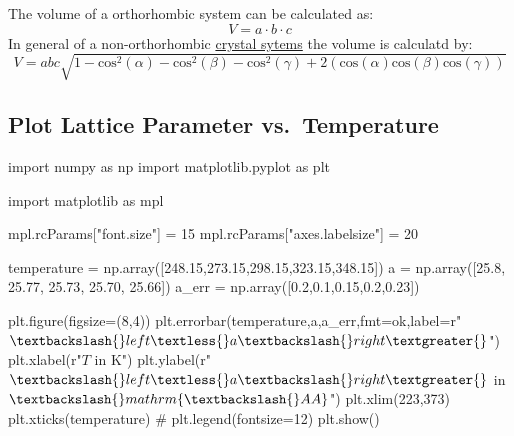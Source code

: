 \documentclass[
  letterpaper,
]{article}
\newenvironment{Shaded}{\begin{snugshade}}{\end{snugshade}}
\newcommand{\CommentTok}[1]{\textcolor[rgb]{0.37,0.37,0.37}{#1}}
\newcommand{\DecValTok}[1]{\textcolor[rgb]{0.68,0.00,0.00}{#1}}
\newcommand{\FloatTok}[1]{\textcolor[rgb]{0.68,0.00,0.00}{#1}}
\newcommand{\ImportTok}[1]{\textcolor[rgb]{0.00,0.46,0.62}{#1}}
\newcommand{\NormalTok}[1]{\textcolor[rgb]{0.00,0.23,0.31}{#1}}
\newcommand{\OperatorTok}[1]{\textcolor[rgb]{0.37,0.37,0.37}{#1}}
\newcommand{\StringTok}[1]{\textcolor[rgb]{0.13,0.47,0.30}{#1}}
\newcommand{\VerbatimStringTok}[1]{\textcolor[rgb]{0.13,0.47,0.30}{#1}}
\begin{document}
The volume of a orthorhombic system can be calculated as: \[
V = a\cdot b \cdot c
\] In general of a non-orthorhombic
\href{https://en.wikipedia.org/wiki/Crystal_system}{crystal sytems} the
volume is calculatd by: \[
V = a b c \sqrt{1-\mathrm{cos}^2(\alpha) -\mathrm{cos}^2(\beta) - \mathrm{cos}^2(\gamma)+ 2(\mathrm{cos}(\alpha) \mathrm{cos}(\beta) \mathrm{cos}(\gamma))}
\]

\hypertarget{plot-lattice-parameter-vs.-temperature}{%
\subsection{Plot Lattice Parameter
vs.~Temperature}\label{plot-lattice-parameter-vs.-temperature}}

\begin{Shaded}
\begin{Highlighting}[]
\ImportTok{import}\NormalTok{ numpy }\ImportTok{as}\NormalTok{ np}
\ImportTok{import}\NormalTok{ matplotlib.pyplot }\ImportTok{as}\NormalTok{ plt}

\ImportTok{import}\NormalTok{ matplotlib }\ImportTok{as}\NormalTok{ mpl}

\NormalTok{mpl.rcParams[}\StringTok{"font.size"}\NormalTok{] }\OperatorTok{=} \DecValTok{15}
\NormalTok{mpl.rcParams[}\StringTok{"axes.labelsize"}\NormalTok{] }\OperatorTok{=} \DecValTok{20}

\NormalTok{temperature }\OperatorTok{=}\NormalTok{ np.array([}\FloatTok{248.15}\NormalTok{,}\FloatTok{273.15}\NormalTok{,}\FloatTok{298.15}\NormalTok{,}\FloatTok{323.15}\NormalTok{,}\FloatTok{348.15}\NormalTok{])}
\NormalTok{a }\OperatorTok{=}\NormalTok{ np.array([}\FloatTok{25.8}\NormalTok{, }\FloatTok{25.77}\NormalTok{, }\FloatTok{25.73}\NormalTok{, }\FloatTok{25.70}\NormalTok{, }\FloatTok{25.66}\NormalTok{])}
\NormalTok{a\_err }\OperatorTok{=}\NormalTok{ np.array([}\FloatTok{0.2}\NormalTok{,}\FloatTok{0.1}\NormalTok{,}\FloatTok{0.15}\NormalTok{,}\FloatTok{0.2}\NormalTok{,}\FloatTok{0.23}\NormalTok{])}

\NormalTok{plt.figure(figsize}\OperatorTok{=}\NormalTok{(}\DecValTok{8}\NormalTok{,}\DecValTok{4}\NormalTok{))}
\NormalTok{plt.errorbar(temperature,a,a\_err,fmt}\OperatorTok{=}\StringTok{\textquotesingle{}ok\textquotesingle{}}\NormalTok{,label}\OperatorTok{=}\VerbatimStringTok{r"$\textbackslash{}left \textless{} a \textbackslash{}right \textgreater{}$"}\NormalTok{)}
\NormalTok{plt.xlabel(}\VerbatimStringTok{r"$T$ in K"}\NormalTok{)}
\NormalTok{plt.ylabel(}\VerbatimStringTok{r"$\textbackslash{}left \textless{} a \textbackslash{}right \textgreater{} $ in $\textbackslash{}mathrm\{\textbackslash{}AA\}$"}\NormalTok{)}
\NormalTok{plt.xlim(}\DecValTok{223}\NormalTok{,}\DecValTok{373}\NormalTok{)}
\NormalTok{plt.xticks(temperature)}
\CommentTok{\# plt.legend(fontsize=12)}
\NormalTok{plt.show()}
\end{Highlighting}
\end{Shaded}
\end{document}
